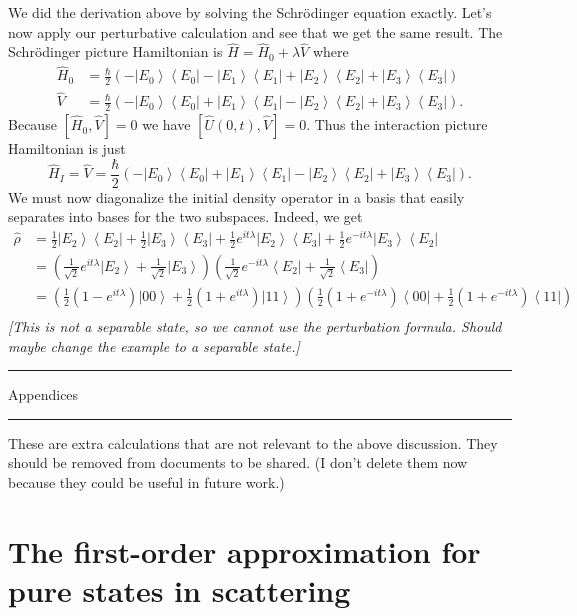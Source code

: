 \documentclass[11pt]{article}
\newcommand{\bra}[1]{\left\langle#1\right|}
\newcommand{\ket}[1]{\left|#1\right\rangle}
\newcommand{\op}[1]{\hat{#1}}
\theoremstyle{theorem}
\theoremstyle{remark}
\theoremstyle{step}
\theoremstyle{gap}
\begin{document}
We did the derivation above by solving the Schr\"odinger equation exactly. Let's now apply our perturbative calculation and see that we get the same result. The Schr\"odinger picture Hamiltonian is \(\op{H} = \op{H}_0 + \lambda \op{V}\) where
\begin{align*}
\op{H}_0 &= \frac{\hbar}{2} \left(-\ket{E_0}\bra{E_0} - \ket{E_1}\bra{E_1} + \ket{E_2}\bra{E_2} + \ket{E_3}\bra{E_3}\right) \\
\op{V} &= \frac{\hbar}{2} \left(-\ket{E_0}\bra{E_0} + \ket{E_1}\bra{E_1} - \ket{E_2}\bra{E_2} + \ket{E_3}\bra{E_3}\right).
\end{align*}
Because \([\op{H}_0, \op{V}] = 0\) we have \([\op{U}(0, t), \op{V}] = 0\). Thus the interaction picture Hamiltonian is just
\[\op{H}_I = \op{V} = \frac{\hbar}{2} \left(-\ket{E_0}\bra{E_0} + \ket{E_1}\bra{E_1} - \ket{E_2}\bra{E_2} + \ket{E_3}\bra{E_3}\right).\]
We must now diagonalize the initial density operator in a basis that easily separates into bases for the two subspaces. Indeed, we get
\begin{align*}
\op{\rho} &= \frac{1}{2}\ket{E_2}\bra{E_2} + \frac{1}{2}\ket{E_3}\bra{E_3} + \frac{1}{2} e^{it\lambda} \ket{E_2}\bra{E_3} + \frac{1}{2} e^{-it\lambda} \ket{E_3}\bra{E_2} \\
&= \left(\frac{1}{\sqrt{2}} e^{it\lambda}{\ket{E_2}} + \frac{1}{\sqrt{2}}\ket{E_3}\right) \left(\frac{1}{\sqrt{2}} e^{-it\lambda}{\bra{E_2}} + \frac{1}{\sqrt{2}}\bra{E_3}\right) \\
&= \left(\frac{1}{2} \left(1-e^{it\lambda}\right){\ket{00}} + \frac{1}{2}\left(1+e^{it\lambda}\right)\ket{11}\right) \left(\frac{1}{2} \left(1+e^{-it\lambda}\right){\bra{00}} + \frac{1}{2}\left(1+e^{-it\lambda}\right)\bra{11}\right) \\
\end{align*}
\emph{[This is not a separable state, so we cannot use the perturbation formula. Should maybe change the example to a separable state.]}




\appendix
\newpage
\hrule
\vspace{3em}
{\Huge Appendices}
\vspace{3em}
\hrule
\vspace{2em}

These are extra calculations that are not relevant to the above discussion. They should be removed from documents to be shared. (I don't delete them now because they could be useful in future work.)


\section{The first-order approximation for pure states in scattering}
\end{document}
